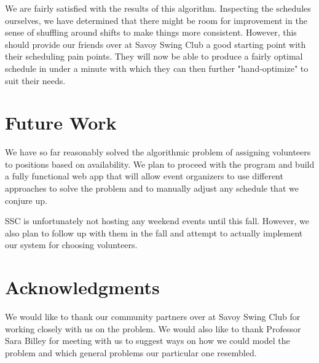 \documentclass[11pt]{article}
\theoremstyle{definition}
\begin{document}
\begin{multicols}{2}
We are fairly satisfied with the results of this algorithm. Inspecting the schedules ourselves, we have determined that there might be room for improvement in the sense of shuffling around shifts to make 
things more consistent. However, this should provide our friends over at Savoy Swing Club a good starting point with their scheduling pain points. They will now be able to produce a fairly optimal schedule
in under a minute with which they can then further "hand-optimize" to suit their needs. 


\section{Future Work}
We have so far reasonably solved the algorithmic problem of assigning volunteers to positions based on availability.
We plan to proceed with the program and build a fully functional web app that will allow event organizers to use different approaches to solve the problem and to manually adjust any schedule that we conjure up.

SSC is unfortunately not hosting any weekend events until this fall.
However, we also plan to follow up with them in the fall and attempt to actually implement our system for choosing volunteers.

\section{Acknowledgments}
We would like to thank our community partners over at Savoy Swing Club for working closely with us on the problem. We would also like to thank Professor Sara Billey for meeting with us to suggest ways
on how we could model the problem and which general problems our particular one resembled.


\end{multicols}
\end{document}
